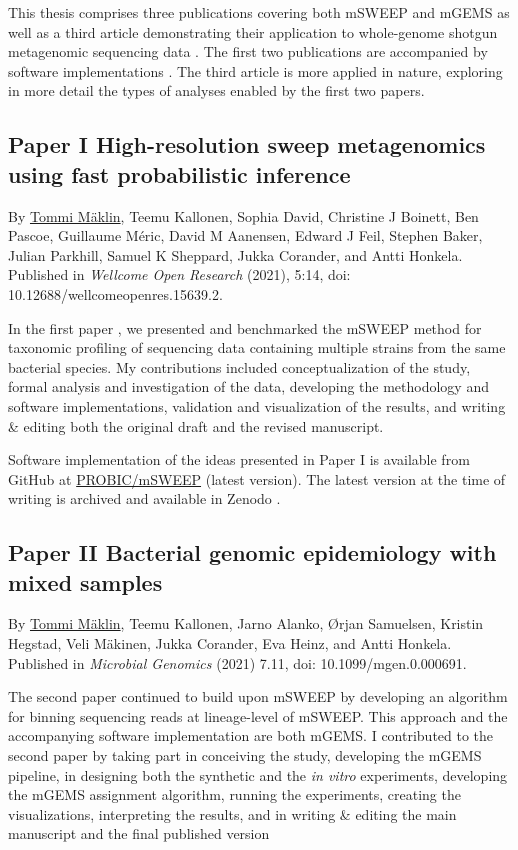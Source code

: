 \documentclass[officiallayout]{tktla}
\begin{document}
This thesis comprises three publications covering both mSWEEP
\citep{maklin_high-resolution_2021} and mGEMS
\citep{maklin_bacterial_2021} as well as a third article demonstrating
their application to whole-genome shotgun metagenomic sequencing data
\citep{maklin_strong_2022}. The first two publications are accompanied
by software implementations \citep{maklin_mSWEEP, maklin_mGEMS}. The
third article is more applied in nature, exploring in more detail the
types of analyses enabled by the first two papers.

\subsection*{Paper I \textemdash High-resolution sweep metagenomics using fast probabilistic inference}
By \underline{Tommi Mäklin}, Teemu Kallonen, Sophia David, Christine J
Boinett, Ben Pascoe, Guillaume Méric, David M Aanensen, Edward J Feil,
Stephen Baker, Julian Parkhill, Samuel K Sheppard, Jukka Corander, and
Antti Honkela. Published in \textit{Wellcome Open Research} (2021),
5:14, doi: 10.12688/wellcomeopenres.15639.2.

In the first paper \citep{maklin_high-resolution_2021}, we presented
and benchmarked the mSWEEP method for taxonomic profiling of
sequencing data containing multiple strains from the same bacterial
species. My contributions included conceptualization of the study,
formal analysis and investigation of the data, developing the
methodology and software implementations, validation and visualization
of the results, and writing \& editing both the original draft and the
revised manuscript.

Software implementation of the ideas presented in Paper I is
available from GitHub at
\href{https://github.com/PROBIC/mSWEEP}{PROBIC/mSWEEP} (latest
version). The latest version at the time of writing is archived and
available in Zenodo \citep{maklin_mSWEEP}.

\subsection*{Paper II \textemdash Bacterial genomic epidemiology with mixed samples}
By \underline{Tommi Mäklin}, Teemu Kallonen, Jarno Alanko, Ørjan
Samuelsen, Kristin Hegstad, Veli Mäkinen, Jukka Corander, Eva Heinz,
and Antti Honkela. Published in \textit{Microbial Genomics} (2021)
7.11, doi: 10.1099/mgen.0.000691.

The second paper \citep{maklin_bacterial_2021} continued to build upon
mSWEEP by developing an algorithm for binning sequencing reads at
lineage-level of mSWEEP. This approach and the accompanying software
implementation are both mGEMS. I contributed to the second paper by
taking part in conceiving the study, developing the mGEMS pipeline, in
designing both the synthetic and the \textit{in vitro} experiments,
developing the mGEMS assignment algorithm, running the experiments,
creating the visualizations, interpreting the results, and in writing
\& editing the main manuscript and the final published version
\end{document}
